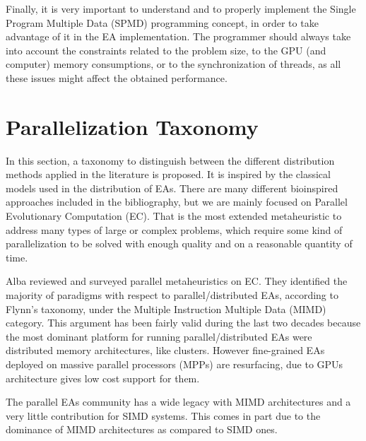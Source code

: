\documentclass{article}
\begin{document}
Finally, it is very important to understand and to properly implement
the Single Program Multiple Data (SPMD)\cite{SPMD-wikipedia} programming
concept, in order to take advantage of it in the EA implementation. The programmer should always take into account the constraints related to the problem size, to the GPU (and computer) memory consumptions, or to the synchronization of threads, as all these issues might affect the obtained performance.


\section{Parallelization Taxonomy}
\label{sec:taxonomy}

In this section, a taxonomy to distinguish between the different
distribution methods applied in the literature is proposed.  
It is inspired by the classical models used in the distribution of EAs. 
There are many different bioinspired approaches included in the bibliography, but we are mainly focused on Parallel Evolutionary Computation (EC). That is the most extended metaheuristic to address many types of large or complex problems, which require some kind of parallelization to be solved with enough quality and on a reasonable quantity of time.


Alba \cite{Alba2005book} reviewed and surveyed parallel metaheuristics
on EC. They identified the majority of paradigms with respect to
parallel/distributed EAs, according to Flynn's taxonomy, under the
Multiple Instruction Multiple Data (MIMD) category. This argument has
been fairly valid during the last two decades because the most
dominant platform for running parallel/distributed EAs were
distributed memory architectures, like clusters. However fine-grained
EAs deployed on massive parallel processors (MPPs) are resurfacing,
due to GPUs architecture gives low cost support for them. 

The parallel EAs community has a wide legacy %
with MIMD architectures and a very little contribution for SIMD systems. This comes in part due to the dominance of MIMD architectures as compared to SIMD ones.
\end{document}
